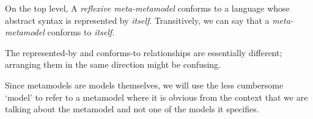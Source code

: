 On the top level, A \textit{reflexive meta-metamodel} conforms to a language whose abstract syntax is represented by \textit{itself}.
Transitively, we can say that a \textit{meta-metamodel} conforms to \textit{itself}.

The represented-by and conforms-to relationships are essentially different; arranging them in the same direction might be confusing.

Since metamodels are models themselves, we will use the less cumbersome `model' to refer to a metamodel where it is obvious from the context that we are talking about the metamodel and not one of the models it specifies.  







